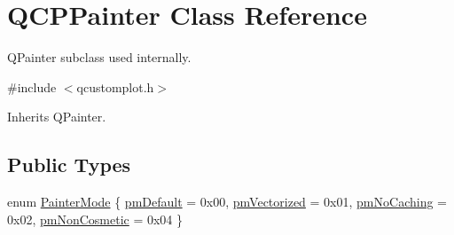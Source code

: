 \hypertarget{class_q_c_p_painter}{\section{Q\-C\-P\-Painter Class Reference}
\label{class_q_c_p_painter}
}


Q\-Painter subclass used internally.  




{\ttfamily \#include $<$qcustomplot.\-h$>$}



Inherits Q\-Painter.

\subsection*{Public Types}
\begin{DoxyCompactItemize}
\item 
enum \hyperlink{class_q_c_p_painter_a156cf16444ff5e0d81a73c615fdb156d}{Painter\-Mode} \{ \hyperlink{class_q_c_p_painter_a156cf16444ff5e0d81a73c615fdb156da3bac5e87e3d58553b297befb4eee2a45}{pm\-Default} = 0x00, 
\hyperlink{class_q_c_p_painter_a156cf16444ff5e0d81a73c615fdb156daeda679cd55dcd468341d07d48a30b6ab}{pm\-Vectorized} = 0x01, 
\hyperlink{class_q_c_p_painter_a156cf16444ff5e0d81a73c615fdb156dae78f9a4eb277a5f9207f50850a51a0b0}{pm\-No\-Caching} = 0x02, 
\hyperlink{class_q_c_p_painter_a156cf16444ff5e0d81a73c615fdb156dac1e481bfaf408f2bd2eaad3ec341f36b}{pm\-Non\-Cosmetic} = 0x04
 \}
\end{DoxyCompactItemize}
